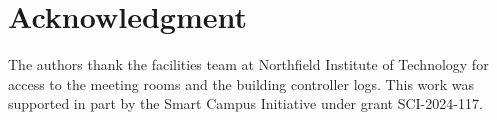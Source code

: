 \documentclass[conference]{IEEEtran}
\begin{document}






\section*{Acknowledgment}
The authors thank the facilities team at Northfield Institute of Technology for access to the meeting rooms and the building controller logs. This work was supported in part by the Smart Campus Initiative under grant SCI-2024-117.



\end{document}

